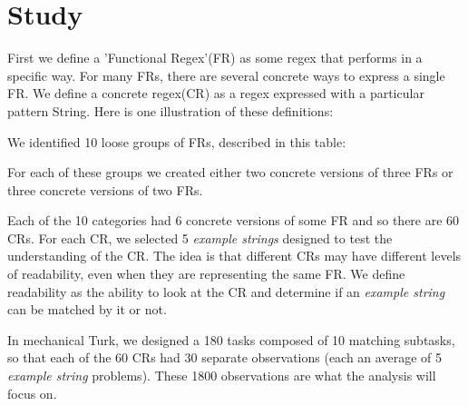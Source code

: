 
\section{Study}

First we define a 'Functional Regex'(FR) as some regex that performs in a specific way.  For many FRs, there are several concrete ways to express a single FR.
We define a concrete regex(CR) as a regex expressed with a particular pattern String.
Here is one illustration of these definitions:


We identified 10 loose groups of FRs, described in this table:


For each of these groups we created either two concrete versions of three FRs or three concrete versions of two FRs.

Each of the 10 categories had 6 concrete versions of some FR and so there are 60 CRs.  For each CR, we selected 5 \emph{example strings} designed to test the understanding of the CR.  The idea is that different CRs may have different levels of readability, even when they are representing the same FR.  We define readability as the ability to look at the CR and determine if an \emph{example string} can be matched by it or not.


In mechanical Turk, we designed a 180 tasks composed of 10 matching subtasks, so that each of the 60 CRs had 30 separate observations (each an average of 5 \emph{example string} problems).  These 1800 observations are what the analysis will focus on.



